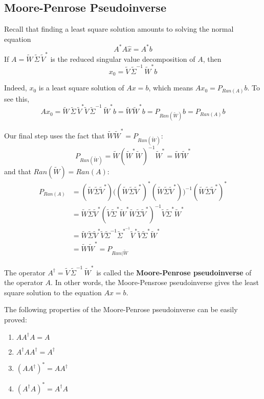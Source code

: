 \subsection{Moore-Penrose Pseudoinverse}

Recall that finding a least square solution amounts to solving the normal equation 
$$A^{*} A \hat{x} = A^{*} b$$
If $A = \widetilde{W} \, \widetilde{\Sigma} \, \widetilde{V}^{*}$ is the reduced singular value decomposition of $A$, then 
$$ x_{0} = \widetilde{V} \, \widetilde{\Sigma}^{-1} \, \widetilde{W}^{*} b$$

Indeed, $x_{0}$ is a least square solution of $Ax = b$, which means $Ax_{0} = P_{Ran(A)} b$. To see this, 
$$Ax_{0} = \widetilde{W} \, \widetilde{\Sigma} \, \widetilde{V}^{*} \widetilde{V} \, \widetilde{\Sigma}^{-1} \, \widetilde{W}^{*} b = \widetilde{W} \widetilde{W}^{*} b = P_{Ran(\widetilde{W})} b = P_{Ran(A)} b $$

Our final step uses the fact that $\widetilde{W} \widetilde{W}^{*} = P_{Ran(\widetilde{W})}$: 
$$P_{Ran(\widetilde{W})} = \widetilde{W} (\widetilde{W}^{*} \widetilde{W})^{-1} \widetilde{W}^{*} = \widetilde{W} \widetilde{W}^{*}$$
and that $Ran(\widetilde{W}) = Ran(A)$:
$$
\begin{aligned}
P_{Ran(A)} &= (\widetilde{W} \widetilde{\Sigma} \widetilde{V}^{*}) \big( (\widetilde{W} \widetilde{\Sigma} \widetilde{V}^{*})^{*} (\widetilde{W} \widetilde{\Sigma} \widetilde{V}^{*}) \big)^{-1} (\widetilde{W} \widetilde{\Sigma} \widetilde{V}^{*})^{*} \\
&= \widetilde{W} \widetilde{\Sigma} \widetilde{V}^{*} ( \widetilde{V} \widetilde{\Sigma}^{*} \widetilde{W}^{*} \widetilde{W} \widetilde{\Sigma} \widetilde{V}^{*} )^{-1} \widetilde{V} \widetilde{\Sigma}^{*} \widetilde{W}^{*} \\
&= \widetilde{W} \widetilde{\Sigma} \widetilde{V}^{*} \widetilde{V} \widetilde{\Sigma}^{-1} \widetilde{\Sigma}^{*^{-1}} \widetilde{V}^{*}  \widetilde{V} \widetilde{\Sigma}^{*} \widetilde{W}^{*} \\
&= \widetilde{W} \widetilde{W}^{*} = P_{Ran(\widetilde{W}}
\end{aligned}
$$

\begin{definition}
The operator $A^{\dagger} = \widetilde{V} \, \widetilde{\Sigma}^{-1} \, \widetilde{W}^{*} $ is called the \textbf{Moore-Penrose pseudoinverse} of the operator $A$. In other words, the Moore-Pensrose pseudoinverse gives the least square solution to the equation $Ax = b$. 

The following properties of the Moore-Penrose pseudoinverse can be easily proved: 
\begin{enumerate}
	\item $AA^{\dagger}A = A$
	\item $A^{\dagger} A A^{\dagger} = A^{\dagger}$
	\item $(AA^{\dagger})^{*} = AA^{\dagger}$
	\item $(A^{\dagger} A)^{*} = A^{\dagger} A$
\end{enumerate}
\end{definition}


